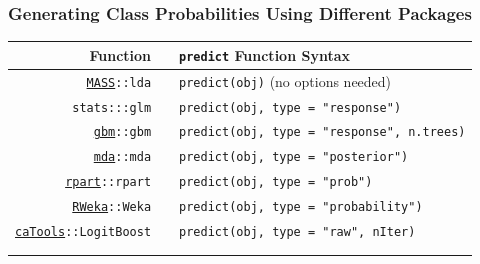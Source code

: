 \documentclass[12 pt]{beamer}\usepackage[]{graphicx}\usepackage[]{color}
\newcommand{\hlstr}[1]{\textcolor[rgb]{0.063,0.58,0.627}{#1}}%
\newcommand{\hlstd}[1]{\textcolor[rgb]{0.196,0.196,0.196}{#1}}%
\newcommand{\hlkwc}[1]{\textcolor[rgb]{0,0.631,0.314}{#1}}%
\newcommand{\hlkwd}[1]{\textcolor[rgb]{0.78,0.227,0.412}{#1}}%
\newcommand{\mxkwd}[1]{\texttt{\hlkwd{#1}}}%
\newcommand{\pkg}[1]{{\fontseries{b}\selectfont #1}}
\renewcommand{\pkg}[1]{{\color{darkgreen}\texttt{#1}}}
\begin{document}
  \begin{frame}[fragile]
\frametitle{Generating Class Probabilities Using Different Packages}

\begin{footnotesize}
\begin{center}
\begin{tabular}{rcl}
{\bf Function} && {\bf {\tt predict} Function Syntax} \\
\hline
 \href{http://cran.r-project.org/web/packages/MASS/index.html}{\pkg{MASS}}\texttt{::}\mxkwd{lda} && {\tt \hlkwd{predict}\hlstd{(obj)}} (no options needed)\\
\pkg{stats}\texttt{:::}\mxkwd{glm} && {\tt \hlkwd{predict}\hlstd{(obj,} \hlkwc{type} \hlstd{=} \hlstr{"response"}\hlstd{)}} \\
\href{http://cran.r-project.org/web/packages/gbm/index.html}{\pkg{gbm}}\texttt{::}\mxkwd{gbm} && {\tt \hlkwd{predict}\hlstd{(obj,} \hlkwc{type} \hlstd{=} \hlstr{"response"}\hlstd{, n.trees)}} \\
\href{http://cran.r-project.org/web/packages/mda/index.html}{\pkg{mda}}\texttt{::}\mxkwd{mda} && {\tt \hlkwd{predict}\hlstd{(obj,} \hlkwc{type} \hlstd{=} \hlstr{"posterior"}\hlstd{)}} \\
\href{http://cran.r-project.org/web/packages/rpart/index.html}{\pkg{rpart}}\texttt{::}\mxkwd{rpart} && {\tt \hlkwd{predict}\hlstd{(obj,} \hlkwc{type} \hlstd{=} \hlstr{"prob"}\hlstd{)}}   \\
\href{http://cran.r-project.org/web/packages/RWeka/index.html}{\pkg{RWeka}}\texttt{::}\mxkwd{Weka} && {\tt \hlkwd{predict}\hlstd{(obj,} \hlkwc{type} \hlstd{=} \hlstr{"probability"}\hlstd{)}}  \\
\href{http://cran.r-project.org/web/packages/caTools/index.html}{\pkg{caTools}}\texttt{::}\mxkwd{LogitBoost}  && {\tt \hlkwd{predict}\hlstd{(obj,} \hlkwc{type} \hlstd{=}  \hlstr{"raw"}\hlstd{, nIter)}} \\
\hline \\
\\
\end{tabular}
\end{center}
\end{footnotesize}
\end{frame}

\end{document}
